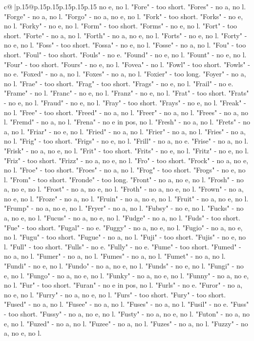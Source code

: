 \documentclass{article}
\begin{document}
{\begin{supertabular}{c@{$\;$}|p{.15\linewidth}@{}p{.15\linewidth}p{.15\linewidth}p{.15\linewidth}p{.15\linewidth}p{.15\linewidth}}
{{{no e, no l. "Fore" {-} too short. "Fores" {-} no a, no l. "Forge" {-} no a, no l. "Forgo" {-} no a, no e, no l. "Fork" {-} too short. "Forks" {-} no e, no l. "Forky" {-} no e, no l. "Form" {-} too short. "Forms" {-} no e, no l. "Fort" {-} too short. "Forte" {-} no a, no l. "Forth" {-} no a, no e, no l. "Forts" {-} no e, no l. "Forty" {-} no e, no l. "Foss" {-} too short. "Fossa" {-} no e, no l. "Fosse" {-} no a, no l. "Fou" {-} too short. "Foul" {-} too short. "Fouls" {-} no e. "Found" {-} no e, no l. "Fount" {-} no e, no l. "Four" {-} too short. "Fours" {-} no e, no l. "Fovea" {-} no l. "Fowl" {-} too short. "Fowls" {-} no e. "Foxed" {-} no a, no l. "Foxes" {-} no a, no l. "Foxier" {-} too long. "Foyer" {-} no a, no l. "Frae" {-} too short. "Frag" {-} too short. "Frags" {-} no e, no l. "Frail" {-} no e. "Frame" {-} no l. "Franc" {-} no e, no l. "Franz" {-} no e, no l. "Frat" {-} too short. "Frats" {-} no e, no l. "Fraud" {-} no e, no l. "Fray" {-} too short. "Frays" {-} no e, no l. "Freak" {-} no l. "Free" {-} too short. "Freed" {-} no a, no l. "Freer" {-} no a, no l. "Frees" {-} no a, no l. "Fremd" {-} no a, no l. "Frena" {-} no e in pos, no l. "Fresh" {-} no a, no l. "Frets" {-} no a, no l. "Friar" {-} no e, no l. "Fried" {-} no a, no l. "Frier" {-} no a, no l. "Fries" {-} no a, no l. "Frig" {-} too short. "Frigs" {-} no e, no l. "Frill" {-} no a, no e. "Frise" {-} no a, no l. "Frisk" {-} no a, no e, no l. "Frit" {-} too short. "Frits" {-} no e, no l. "Fritz" {-} no e, no l. "Friz" {-} too short. "Frizz" {-} no a, no e, no l. "Fro" {-} too short. "Frock" {-} no a, no e, no l. "Froe" {-} too short. "Froes" {-} no a, no l. "Frog" {-} too short. "Frogs" {-} no e, no l. "From" {-} too short. "Fronde" {-} too long. "Front" {-} no a, no e, no l. "Frosh" {-} no a, no e, no l. "Frost" {-} no a, no e, no l. "Froth" {-} no a, no e, no l. "Frown" {-} no a, no e, no l. "Froze" {-} no a, no l. "Fruin" {-} no a, no e, no l. "Fruit" {-} no a, no e, no l. "Frump" {-} no a, no e, no l. "Fryer" {-} no a, no l. "Fubsy" {-} no e, no l. "Fucks" {-} no a, no e, no l. "Fucus" {-} no a, no e, no l. "Fudge" {-} no a, no l. "Fuds" {-} too short. "Fue" {-} too short. "Fugal" {-} no e. "Fuggy" {-} no a, no e, no l. "Fugio" {-} no a, no e, no l. "Fugu" {-} too short. "Fugue" {-} no a, no l. "Fuji" {-} too short. "Fujis" {-} no e, no l. "Full" {-} too short. "Fulls" {-} no e. "Fully" {-} no e. "Fume" {-} too short. "Fumed" {-} no a, no l. "Fumer" {-} no a, no l. "Fumes" {-} no a, no l. "Fumet" {-} no a, no l. "Fundi" {-} no e, no l. "Fundo" {-} no a, no e, no l. "Funds" {-} no e, no l. "Fungi" {-} no e, no l. "Fungo" {-} no a, no e, no l. "Funky" {-} no a, no e, no l. "Funny" {-} no a, no e, no l. "Fur" {-} too short. "Furan" {-} no e in pos, no l. "Furls" {-} no e. "Furor" {-} no a, no e, no l. "Furry" {-} no a, no e, no l. "Furs" {-} too short. "Fury" {-} too short. "Fused" {-} no a, no l. "Fusee" {-} no a, no l. "Fuses" {-} no a, no l. "Fusil" {-} no e. "Fuss" {-} too short. "Fussy" {-} no a, no e, no l. "Fusty" {-} no a, no e, no l. "Futon" {-} no a, no e, no l. "Fuzed" {-} no a, no l. "Fuzee" {-} no a, no l. "Fuzes" {-} no a, no l. "Fuzzy" {-} no a, no e, no l. }}}
\end{supertabular}}
\end{document}
